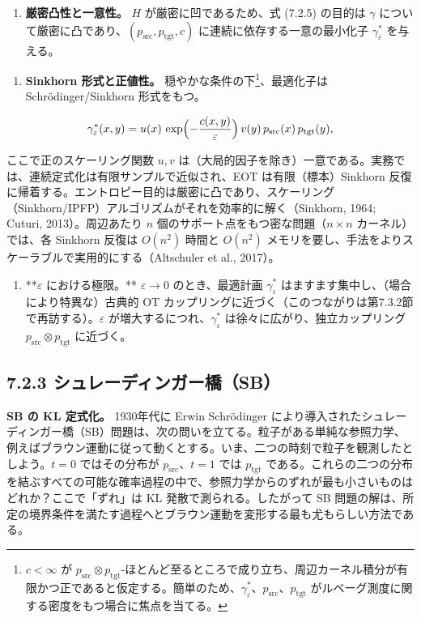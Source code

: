 \begin{enumerate}
\item \textbf{厳密凸性と一意性。} $H$ が厳密に凹であるため、式 (7.2.5) の目的は $\gamma$ について厳密に凸であり、$(p_{\mathrm{src}},p_{\mathrm{tgt}},c)$ に連続に依存する一意の最小化子 $\gamma_\varepsilon^*$ を与える。
\end{enumerate}


\begin{enumerate}
\item \textbf{Sinkhorn 形式と正値性。} 穏やかな条件の下\footnote{$c<\infty$ が $p_{\mathrm{src}}\otimes p_{\mathrm{tgt}}$-ほとんど至るところで成り立ち、周辺カーネル積分が有限かつ正であると仮定する。簡単のため、$\gamma_\varepsilon^*$、$p_{\mathrm{src}}$、$p_{\mathrm{tgt}}$ がルベーグ測度に関する密度をもつ場合に焦点を当てる。}、最適化子は Schrödinger/Sinkhorn 形式をもつ。
\end{enumerate}


\[
\gamma_\varepsilon^*(x,y)=u(x)\,\exp\Bigl(-\frac{c(x,y)}{\varepsilon}\Bigr)\,v(y)\,p_{\mathrm{src}}(x)\,p_{\mathrm{tgt}}(y),
\]


ここで正のスケーリング関数 $u,v$ は（大局的因子を除き）一意である。実務では、連続定式化は有限サンプルで近似され、EOT は有限（標本）Sinkhorn 反復に帰着する。エントロピー目的は厳密に凸であり、スケーリング（Sinkhorn/IPFP）アルゴリズムがそれを効率的に解く（Sinkhorn, 1964; Cuturi, 2013）。周辺あたり $n$ 個のサポート点をもつ密な問題（$n\times n$ カーネル）では、各 Sinkhorn 反復は $O(n^2)$ 時間と $O(n^2)$ メモリを要し、手法をよりスケーラブルで実用的にする（Altschuler et al., 2017）。

\begin{enumerate}
\item **$\varepsilon$ における極限。** $\varepsilon\to 0$ のとき、最適計画 $\gamma_\varepsilon^*$ はますます集中し、（場合により特異な）古典的 OT カップリングに近づく（このつながりは第7.3.2節で再訪する）。$\varepsilon$ が増大するにつれ、$\gamma_\varepsilon^*$ は徐々に広がり、独立カップリング $p_{\mathrm{src}}\otimes p_{\mathrm{tgt}}$ に近づく。
\end{enumerate}


\subsection*{7.2.3 シュレーディンガー橋（SB）}


\textbf{SB の KL 定式化。} 1930年代に Erwin Schrödinger により導入されたシュレーディンガー橋（SB）問題は、次の問いを立てる。粒子がある単純な参照力学、例えばブラウン運動に従って動くとする。いま、二つの時刻で粒子を観測したとしよう。$t=0$ ではその分布が $p_{\mathrm{src}}$、$t=1$ では $p_{\mathrm{tgt}}$ である。これらの二つの分布を結ぶすべての可能な確率過程の中で、参照力学からのずれが最も小さいものはどれか？ここで「ずれ」は KL 発散で測られる。したがって SB 問題の解は、所定の境界条件を満たす過程へとブラウン運動を変形する最も尤もらしい方法である。

